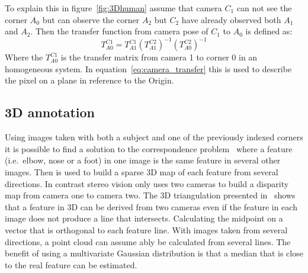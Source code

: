 \par To explain this in figure~\ref{fig:3Dhuman} assume that camera $C_1$ can not see the corner $A_0$ but can observe the corner $A_2$ but $C_2$ have already observed both $A_1$ and $A_2$. Then the transfer function from camera pose of $C_1$ to $A_0$ is defined as:
\begin{equation}
    T^{C1}_{A0} = T^{C1}_{A1} (T^{C2}_{A1})^{-1}(T^{C2}_{A0})^{-1}
\end{equation}
Where the $T^{C1}_{A0}$ is the transfer matrix from camera 1 to \aruco corner 0 in an homogeneous system.
In equation~\ref{eq:camera_transfer} this is used to describe the pixel on a plane in reference to the Origin.

\subsection{3D annotation}%
\label{sub:3D_anotation}
Using images taken with both a subject and one of the previously indexed corners it is possible to find a solution to the correspondence
problem~\cite{siciliano2010robotics} where a feature (i.e.\ elbow, nose or a foot) in one image is the same feature in several other images.
Then is used to build a sparse 3D map of each feature from several directions.
In contrast stereo vision only uses two cameras to build a disparity map from camera one to camera two.
The 3D triangulation presented in~\cite{zhang2006midpoint} shows that a feature in 3D can be derived from two cameras even if the feature in each image does not produce a line that intersects.
Calculating the midpoint on a vector that is orthogonal to each feature line.
With images taken from several directions, a point cloud can assume ably be calculated from several lines.
The benefit of using a multivariate Gaussian distribution is that a median that is close to the real feature can be estimated.

